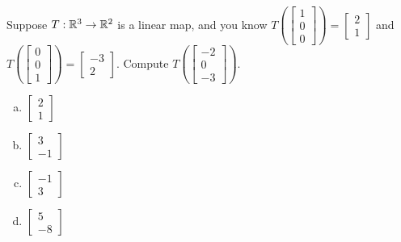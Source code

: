 \begin{applicationActivities}
\begin{activity}{2}
Suppose \(T: \mathbb{R}^3 \rightarrow \mathbb{R}^2\) is a linear map, and you know
\(
  T\left(\begin{bmatrix} 1 \\ 0 \\ 0 \end{bmatrix} \right)
=
  \begin{bmatrix} 2 \\ 1 \end{bmatrix}
\)
and
\(
  T\left(\begin{bmatrix} 0 \\ 0 \\ 1 \end{bmatrix} \right)
=
  \begin{bmatrix} -3 \\ 2 \end{bmatrix}
\).
Compute \(T\left(\begin{bmatrix} -2 \\ 0 \\ -3 \end{bmatrix}\right)\).
\begin{multicols}{2}
\begin{enumerate}[(a)]
\item \(\begin{bmatrix} 2 \\ 1\end{bmatrix}\)
\item \(\begin{bmatrix} 3 \\ -1 \end{bmatrix}\)
\item \(\begin{bmatrix} -1 \\ 3 \end{bmatrix}\)
\item \(\begin{bmatrix} 5 \\ -8 \end{bmatrix}\)
\end{enumerate}
\end{multicols}
\end{activity}


\end{applicationActivities}
